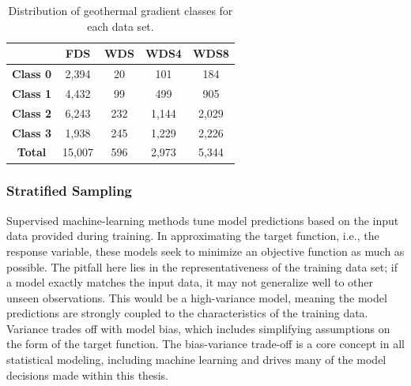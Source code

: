 \begin{table}[htp]
\centering
\begin{tabular}{c|c|c|c|c|}
\cline{2-5}
 & \textbf{FDS} & \textbf{WDS} & \textbf{WDS4} & \textbf{WDS8} \\ \hline
\multicolumn{1}{|c|}{\textbf{Class 0}} & 2,394 & 20 & 101 & 184 \\ \hline
\multicolumn{1}{|c|}{\textbf{Class 1}} & 4,432 & 99 & 499 & 905 \\ \hline
\multicolumn{1}{|c|}{\textbf{Class 2}} & 6,243 & 232 & 1,144 & 2,029 \\ \hline
\multicolumn{1}{|c|}{\textbf{Class 3}} & 1,938 & 245 & 1,229 & 2,226 \\ \hline
\multicolumn{1}{|c|}{\textbf{Total}} & 15,007 & 596 & 2,973 & 5,344 \\ \hline
\end{tabular}
\caption[Data set class distribution]{Distribution of geothermal gradient classes for each data set.}
\label{tab:data_set_class_count}
\end{table}

\subsubsection{Stratified Sampling}\label{ch3:strat_sample}

Supervised machine-learning methods tune model predictions based on the input data provided during training. In approximating the target function, i.e., the response variable, these models seek to minimize an objective function as much as possible. The pitfall here lies in the representativeness of the training data set; if a model exactly matches the input data, it may not generalize well to other unseen observations. This would be a high-variance model, meaning the model predictions are strongly coupled to the characteristics of the training data. Variance trades off with model bias, which includes simplifying assumptions on the form of the target function. The bias-variance trade-off is a core concept in all statistical modeling, including machine learning \citep[p.\ 33-36]{james_introduction_2013} and drives many of the model decisions made within this thesis.

